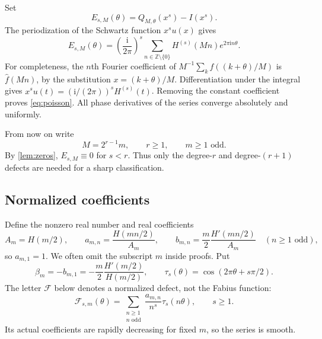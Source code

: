 \documentclass[11pt,a4paper]{article}
\numberwithin{equation}{section}
\theoremstyle{plain}
\theoremstyle{definition}
\theoremstyle{remark}
\newcommand{\Z}{\mathbb Z}
\newcommand{\ii}{\mathrm i}
\newcommand{\oddSum}{\sum_{\substack{n\ge1\\n\text{ odd}}}}
\begin{document}
Set
\begin{equation}\label{eq:defect}
 E_{s,M}(\theta)=Q_{M,\theta}(x^s)-I(x^s).
\end{equation}
The periodization of the Schwartz function $x^su(x)$ gives
\begin{equation}\label{eq:poisson}
 E_{s,M}(\theta)=\left(\frac{\ii}{2\pi}\right)^s
 \sum_{n\in\Z\setminus\{0\}}H^{(s)}(Mn)e^{2\pi\ii n\theta}.
\end{equation}
For completeness, the $n$th Fourier coefficient of
$M^{-1}\sum_k f((k+\theta)/M)$ is $\widehat f(Mn)$, by the substitution
$x=(k+\theta)/M$. Differentiation under the integral gives
$\widehat{x^su}(t)=(\ii/(2\pi))^sH^{(s)}(t)$. Removing the constant
coefficient proves \eqref{eq:poisson}. All phase derivatives of the series
converge absolutely and uniformly.

From now on write
\begin{equation}\label{eq:mesh}
 M=2^{r-1}m,\qquad r\ge1,\qquad m\ge1\text{ odd}.
\end{equation}
By \cref{lem:zeros}, $E_{s,M}\equiv0$ for $s<r$. Thus only the degree-$r$
and degree-$(r+1)$ defects are needed for a sharp classification.

\subsection{Normalized coefficients}

Define the nonzero real number and real coefficients
\begin{equation}\label{eq:ab}
 A_m=H(m/2),\qquad
 a_{m,n}=\frac{H(mn/2)}{A_m},\qquad
 b_{m,n}=\frac{m}{2}\frac{H'(mn/2)}{A_m}
 \quad(n\ge1\text{ odd}),
\end{equation}
so $a_{m,1}=1$. We often omit the subscript $m$ inside proofs. Put
\begin{equation}\label{eq:beta}
 \beta_m=-b_{m,1}=-\frac m2\frac{H'(m/2)}{H(m/2)},
 \qquad \tau_s(\theta)=\cos(2\pi\theta+s\pi/2).
\end{equation}
The letter $\mathcal F$ below denotes a normalized defect, not the Fabius
function:
\begin{equation}\label{eq:F}
 \mathcal F_{s,m}(\theta)=
 \oddSum \frac{a_{m,n}}{n^s}\tau_s(n\theta),\qquad s\ge1.
\end{equation}
Its actual coefficients are rapidly decreasing for fixed $m$, so the
series is smooth.
\end{document}
